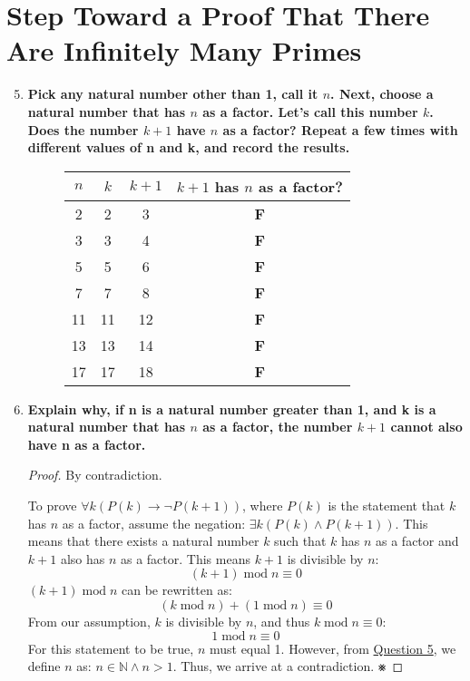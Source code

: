 \documentclass[article, 12pt]{article}
\theoremstyle{definition}
\newcommand{\Mod}[1]{\;\mathrm{mod}\; #1} %
\newcommand{\nats}{\mathbb{N}}
\begin{document}
    \section{Step Toward a Proof That There Are Infinitely Many Primes}
    \begin{enumerate}[(1)]
        \setcounter{enumi}{4}
        \item \textbf{Pick any natural number other than 1, call it $n$. Next, choose a natural number that has $n$ as a factor. Let’s call this number $k$. Does the number $k + 1$ have $n$ as a factor? Repeat a few times with different values of n and k, and record the results.}\label{question:list n and k and k + 1}
        \begin{figure}[H]
            \centering
            \begin{tabular}{|c|c|c|c|}
                \hline
                $n$ & $k$ & $k + 1$ & $k + 1$ has $n$ as a factor? \\
                \hline
                2 & 2 & 3 & \textbf{F} \\
                3 & 3 & 4 & \textbf{F} \\
                5 & 5 & 6 & \textbf{F} \\
                7 & 7 & 8 & \textbf{F} \\
                11 & 11 & 12 & \textbf{F} \\
                13 & 13 & 14 & \textbf{F} \\
                17 & 17 & 18 & \textbf{F} \\
                \hline
            \end{tabular}
        \end{figure}        
        \item \textbf{Explain why, if n is a natural number greater than 1, and k is a natural number that has $n$ as a factor, the number $k + 1$ cannot also have n as a factor.}\label{question:k + 1 cannot have n as a factor}
        \begin{proof}
            By contradiction. 
            
            To prove $\forall k(P(k) \to \neg P(k+1))$, where $P(k)$ is the statement that $k$ has $n$ as a factor, assume the negation: $\exists k (P(k) \land P(k+1))$. This means that there exists a natural number $k$ such that $k$ has $n$ as a factor and $k+1$ also has $n$ as a factor. This means $k+1$ is divisible by $n$: 
            \[ (k+1) \Mod{n} \equiv 0 \]
            $(k+1) \Mod{n}$ can be rewritten as:
            \[ (k \Mod{n}) + (1 \Mod{n}) \equiv 0 \]
            From our assumption, $k$ is divisible by $n$, and thus $k \Mod{n} \equiv 0$:
            \[ 1 \Mod{n} \equiv 0 \]
            For this statement to be true, $n$ must equal 1. However, from \hyperref[question:list n and k and k + 1]{Question 5}, we define $n$ as: $n \in \nats \land n > 1$. Thus, we arrive at a contradiction. $\smashtimes$ 
            

\end{proof}
\end{enumerate}
\end{document}
